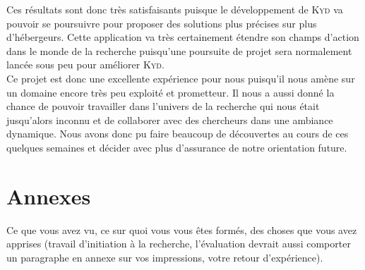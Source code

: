 \documentclass[10pt]{article}
\newcommand{\KYD}{\textsc{Kyd}\xspace}
\begin{document}
Ces résultats sont donc très satisfaisants puisque le développement de \KYD va pouvoir se poursuivre pour proposer des solutions plus précises sur plus d'hébergeurs. Cette application va très certainement étendre son champs d'action dans le monde de la recherche puisqu'une poursuite de projet sera normalement lancée sous peu pour améliorer \KYD.\\

Ce projet est donc une excellente expérience pour nous puisqu'il nous amène sur un domaine encore très peu exploité et prometteur. Il nous a aussi donné la chance de pouvoir travailler dans l'univers de la recherche qui nous était jusqu'alors inconnu et de collaborer avec des chercheurs dans une ambiance dynamique. Nous avons donc pu faire beaucoup de découvertes au cours de ces quelques semaines et décider avec plus d'assurance de notre orientation future.\\


\section{Annexes}

Ce que vous avez vu, ce sur quoi vous vous êtes formés, des choses que
vous avez apprises (travail d'initiation à la recherche, l'évaluation
devrait aussi comporter un paragraphe en annexe sur vos impressions,
votre retour d'expérience).



\end{document}
